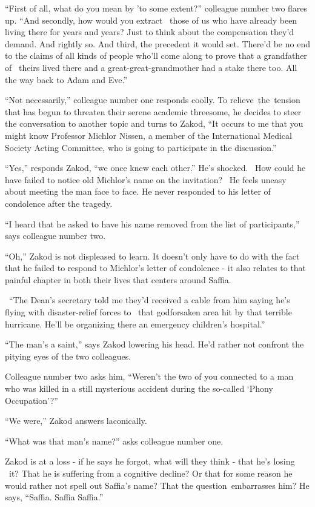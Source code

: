 \documentclass[twoside,11pt]{book}
\begin{document}
``First of all, what do you mean by 'to some extent?'' colleague number two flares up.
``And secondly, how would you extract \ those of us who have already been living there for years and
years? Just to think about the compensation they'd demand. And rightly so. And third, the precedent it would set.
There'd be no end to the claims of all kinds of people who'll come along to prove that a grandfather of \ theirs lived
there and a great-great-grandmother had a stake there too. All the way back to Adam and Eve.''

``Not necessarily,'' colleague number one responds coolly. To relieve~the~tension that has
begun to threaten their serene academic threesome, he decides to steer the conversation to another topic and turns to
Zakod, ``It occurs to me that you might know Professor Michlor Nissen, a member of the International
Medical Society Acting Committee, who is going to participate in the discussion.''

``Yes,'' responds Zakod, ``we once knew each other.'' He's shocked.
~How could he have failed to notice old Michlor's name on the invitation? ~He feels uneasy about meeting the man face
to face. He never responded to his letter of condolence after the tragedy.

``I heard that he asked to have his name removed from the list of participants,'' says
colleague number two.

``Oh,'' Zakod is not displeased to learn. It doesn't only have to do with the fact that he
failed to respond to Michlor's letter of condolence - it also relates to that painful chapter in both their lives that
centers around Saffia.

~``The Dean's secretary told me they'd received a cable from him saying he's flying with disaster-relief
forces to {\ }that godforsaken area hit by that terrible hurricane. He'll be organizing there an
emergency children's hospital.''

``The man's a saint,'' says Zakod lowering his head. He'd rather not confront the pitying eyes
of the two colleagues.

Colleague number two asks him, ``Weren't the two of you connected to a man who was killed in a still
mysterious accident during the so-called `Phony Occupation'?''

``We were,'' Zakod answers laconically.

``What was that man's name?'' asks colleague number one.

Zakod is at a loss - if he says he forgot, what will they think - that he's losing
{\ }it?{ }That he is suffering from a cognitive decline? Or that for some reason he would
rather not spell out Saffia's name? That the question~embarrasses him? He says, ``Saffia. Saffia
Saffia.''
\end{document}
